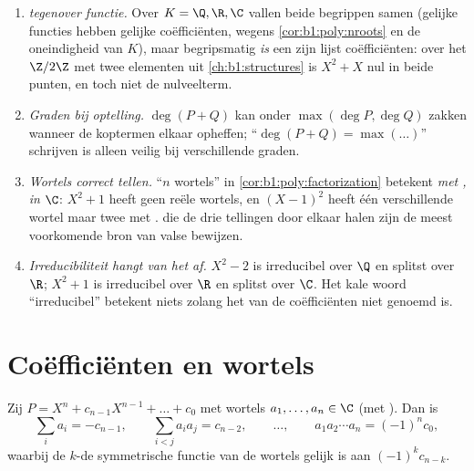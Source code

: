 \begin{remark}\label{rem:b1:poly:pitfalls}
\begin{enumerate}
  \item \emph{ tegenover functie.} Over $K = \Q, \R, \C$ vallen
        beide begrippen samen (gelijke functies hebben gelijke
        coëfficiënten, wegens \cref{cor:b1:poly:nroots} en de
        oneindigheid van $K$), maar begripsmatig \emph{is} een 
        zijn lijst coëfficiënten: over het  $\Z/2\Z$ met twee
        elementen uit \cref{ch:b1:structures} is $X^2 + X$ nul in beide
        punten, en toch niet de nulveelterm.
  \item \emph{Graden bij optelling.} $\deg(P + Q)$ kan onder $\max(\deg
        P, \deg Q)$ zakken wanneer de koptermen elkaar opheffen;
        ``$\deg(P + Q) = \max(\dots)$'' schrijven is alleen veilig bij
        verschillende graden.
  \item \emph{Wortels correct tellen.} ``$n$ wortels'' in
        \cref{cor:b1:poly:factorization} betekent \emph{met
        , in $\C$}: $X^2 + 1$ heeft geen reële wortels, en
        $(X-1)^2$ heeft één verschillende wortel maar twee met
        .  die de drie tellingen door elkaar
        halen zijn de meest voorkomende bron van valse bewijzen.
  \item \emph{Irreducibiliteit hangt van het  af.} $X^2 - 2$ is
        irreducibel over $\Q$ en splitst over $\R$; $X^2 + 1$ is
        irreducibel over $\R$ en splitst over $\C$. Het kale woord
        ``irreducibel'' betekent niets zolang het  van de
        coëfficiënten niet genoemd is.
\end{enumerate}
\end{remark}

\section{Coëfficiënten en wortels}

\begin{theorem}\label{thm:b1:poly:vieta}
Zij $P = X^n + c_{n-1} X^{n-1} + \dots + c_0$  met wortels $a_1,
\dots, a_n \in \C$ (met ). Dan is
\[
\sum_i a_i = -c_{n-1},
\qquad
\sum_{i < j} a_i a_j = c_{n-2},
\qquad \dots, \qquad
a_1 a_2 \cdots a_n = (-1)^n c_0 ,
\]
waarbij de $k$-de symmetrische functie van de wortels gelijk is aan
$(-1)^k c_{n-k}$.
\end{theorem}

